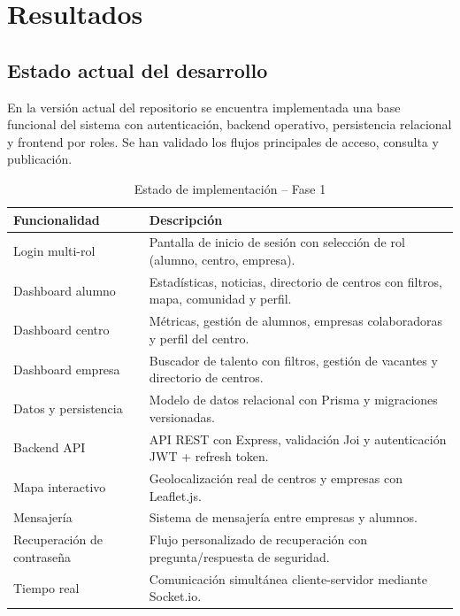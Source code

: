 \documentclass[12pt, a4paper]{report}
\begin{document}
\chapter{Resultados}

\section{Estado actual del desarrollo}

En la versión actual del repositorio se encuentra implementada una base funcional del sistema con
autenticación, backend operativo, persistencia relacional y frontend por roles. Se han validado los
flujos principales de acceso, consulta y publicación.

\vspace{0.5em}
\begin{table}[H]
  \centering
  \caption{Estado de implementación – Fase 1}
  \begin{tabularx}{\textwidth}{lX}
    \toprule
    \textbf{Funcionalidad} & \textbf{Descripción} \\
    \midrule
    Login multi-rol
      & Pantalla de inicio de sesión con selección de rol (alumno, centro, empresa). \\
    \addlinespace
    Dashboard alumno
      & Estadísticas, noticias, directorio de centros con filtros, mapa, comunidad y perfil. \\
    \addlinespace
    Dashboard centro
      & Métricas, gestión de alumnos, empresas colaboradoras y perfil del centro. \\
    \addlinespace
    Dashboard empresa
      & Buscador de talento con filtros, gestión de vacantes y directorio de centros. \\
    \addlinespace
    Datos y persistencia
      & Modelo de datos relacional con Prisma y migraciones versionadas. \\
    \addlinespace
    Backend API
      & API REST con Express, validación Joi y autenticación JWT + refresh token. \\
    \addlinespace
    Mapa interactivo
      & Geolocalización real de centros y empresas con Leaflet.js. \\
    \addlinespace
    Mensajería
      & Sistema de mensajería entre empresas y alumnos. \\
    \addlinespace
    Recuperación de contraseña
      & Flujo personalizado de recuperación con pregunta/respuesta de seguridad. \\
    \addlinespace
    Tiempo real
      & Comunicación simultánea cliente-servidor mediante Socket.io. \\
    \bottomrule
  \end{tabularx}
\end{table}
\end{document}
